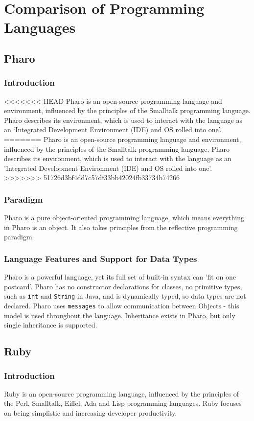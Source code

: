 \section*{Comparison of Programming Languages}
\subsection*{Pharo}
\subsubsection*{Introduction}
<<<<<<< HEAD
Pharo is an open-source programming language and environment, influenced by the principles of the Smalltalk programming language. Pharo describes its environment, which is used to interact with the language as an `Integrated Development Environment (IDE) and OS rolled into one'. 
=======
Pharo is an open-source programming language and environment, influenced by the principles of the Smalltalk programming language. Pharo describes its environment, which is used to interact with the language as an 'Integrated Development Environment (IDE) and OS rolled into one'. 
>>>>>>> 51726d3bf4dd7c57df33bb42024fb33734b74266
\subsubsection*{Paradigm}
Pharo is a pure object-oriented programming language, which means everything in Pharo is an object. It also takes principles from the reflective programming paradigm.
\subsubsection*{Language Features and Support for Data Types}
Pharo is a powerful language, yet its full set of built-in syntax can 'fit on one postcard'. Pharo has no constructor declarations for classes, no primitive types, such as \texttt{int} and \texttt{String} in Java, and is dynamically typed, so data types are not declared. Pharo uses \texttt{messages} to allow communication between Objects - this model is used throughout the language. Inheritance exists in Pharo, but only single inheritance is supported.
\subsection*{Ruby}
\subsubsection*{Introduction}
Ruby is an open-source programming language, influenced by the principles of the Perl, Smalltalk, Eiffel, Ada and Lisp programming languages. Ruby focuses on being simplistic and increasing developer productivity.
